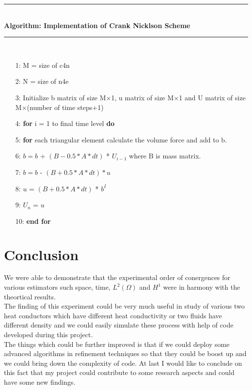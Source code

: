 \documentclass{report}
\numberwithin{equation}{chapter}
\begin{document}
\begin{spacing}{1.5}
\noindent\rule{12cm}{0.4pt}\\
\textbf{Algorithm: Implementation of Crank Nicklson Scheme}\\
\noindent\rule{12cm}{0.4pt}\\
\begin{itemize}
\item[1:] M = size of c4n
\item[2:] N = size of n4e
\item[3:] Initialize b matrix of size M$\times$1, u matrix of size M$\times$1 and U matrix of size M$\times$(number of time steps+1)
\item[4:] \textbf{for} i = 1 to final time level \textbf{do}
\item[5:] \textbf{for} each triangular element calculate the volume force and add to b.
\item[6:] $b = b$ + $(B-0.5*A*dt)$ * $U_{i-1}$ where B is mass matrix.
\item[7:] $b = b$ - $(B+0.5*A*dt)*u$
\item[8:] $u$ = $(B+0.5*A*dt)$ * $b^{I}$
\item[9:] $U_{n}$ = $u$
\item[10:] \textbf{end for}
\end{itemize}
\end{spacing}
\chapter{Conclusion}
\begin{spacing}{1.5}
We were able to demonstrate that the experimental order of conergences for various estimators such space, time, $L^{2}(\Omega)$ and $H^{1}$ were in harmony with the theortical results.\\
The finding of this experiment could be very much useful in study of various two heat conductors which have different heat conductivity or two fluids have different density and we could easily simulate these process with help of code developed during this project.\\
The things which could be further improved is that if we could deploy some advanced algorithms in refinement techniques so that they could be boost up and we could bring down the complexity of code. At last I would like to conclude on this fact that my project could contribute to some research aspects and could have some new findings.
\end{spacing}
\end{document}
